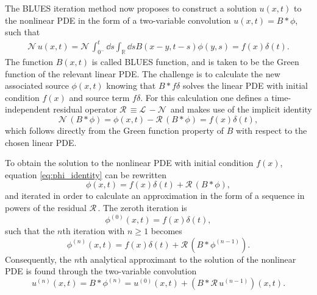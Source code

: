\documentclass[amsmath,amssymb,amsfonts,aps,pre,preprint,superscriptaddress,showpacs,showkeys,longbibliography,nofootinbib]{revtex4-1}
\newcommand*{\lop}{\mathcal{L}\,}
\newcommand*{\nlop}{\mathcal{N}\,}
\newcommand*{\rop}{\mathcal{R}\,}
\begin{document}
The BLUES iteration method now proposes to construct a solution $u(x, t)$ to the nonlinear PDE in the form of a two-variable convolution $u(x, t) = B * \phi$, such that
\begin{align}
    \label{eq:rewriten_nonlinear_operator_delta_u}
	\nlop u(x, t)=\nlop\int_{0^{-}}^{t} \dd{s} \int_{\mathbb{R}} \dd{s} B\left(x-y, t-s\right) \phi\left(y, s\right)=f(x) \delta(t).
\end{align}
The function $B(x, t)$ is called BLUES function, and is taken to be the Green function of the relevant linear PDE. The challenge is to calculate the new associated source $\phi(x,t)$ knowing that $B \ast f \delta$ solves the linear PDE with initial condition $f(x)$ and source term $f \delta$. For this calculation one defines a time-independent residual operator $\rop \equiv \lop - \nlop$ and makes use of the implicit identity
\begin{equation}
    \label{eq:phi_identity}
    \nlop (B\ast\phi) = \phi(x,t) - \rop (B\ast\phi) = f(x)\delta(t), 
\end{equation}
which follows directly from the Green function property of $B$ with respect to the chosen linear PDE.

To obtain the solution to the nonlinear PDE with initial condition $f(x)$, equation \eqref{eq:phi_identity} can be rewritten 
\begin{equation}
    \label{eq:phi_identity_re}
  \phi(x,t)  = f(x)\delta(t) +  \rop (B\ast\phi), 
\end{equation}
and iterated in order to calculate an approximation in the form of a sequence in powers of the residual $\rop$. The zeroth iteration is 
\begin{equation}
    \label{eq:zeroth_order}
    \phi^{(0)}(x,t) = f(x) \delta (t),
\end{equation}
such that the $n$th iteration with $n\geq1$ becomes
\begin{equation}
    \label{eq:nth_order}
    \phi^{(n)}(x,t) = f(x) \delta (t) + \rop (B \ast \phi^{(n-1)}).
\end{equation}
Consequently, the $n$th analytical approximant to the solution of the nonlinear PDE is found through the two-variable convolution
\begin{equation}
    \label{eq:nth_order_u_appendix}
    u^{(n)}(x,t) = B \ast \phi^{(n)} = u^{(0)}(x,t) + (B\ast \rop u^{(n-1)})(x,t).
\end{equation}


\end{document}
